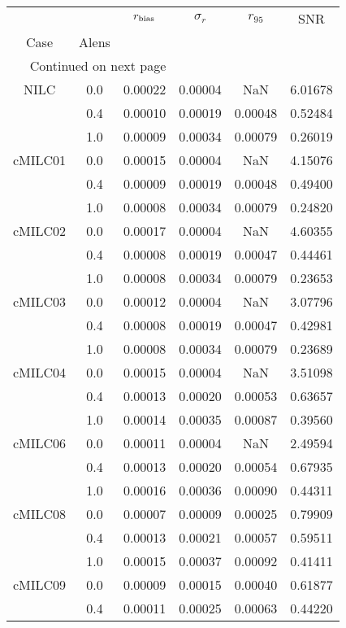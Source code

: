 \begin{longtable}{cccccc}
\toprule
     &     &  $r_{\rm bias}$  &  $\sigma_r$ &  $r_{95}$ &     SNR \\
Case & Alens &                  &             &           &         \\
\midrule
\endhead
\midrule
\multicolumn{3}{r}{{Continued on next page}} \\
\midrule
\endfoot

\bottomrule
\endlastfoot
NILC & 0.0 & 0.00022 & 0.00004 & NaN & 6.01678 \\
     & 0.4 & 0.00010 & 0.00019 & 0.00048 & 0.52484 \\
     & 1.0 & 0.00009 & 0.00034 & 0.00079 & 0.26019 \\
cMILC01 & 0.0 & 0.00015 & 0.00004 & NaN & 4.15076 \\
     & 0.4 & 0.00009 & 0.00019 & 0.00048 & 0.49400 \\
     & 1.0 & 0.00008 & 0.00034 & 0.00079 & 0.24820 \\
cMILC02 & 0.0 & 0.00017 & 0.00004 & NaN & 4.60355 \\
     & 0.4 & 0.00008 & 0.00019 & 0.00047 & 0.44461 \\
     & 1.0 & 0.00008 & 0.00034 & 0.00079 & 0.23653 \\
cMILC03 & 0.0 & 0.00012 & 0.00004 & NaN & 3.07796 \\
     & 0.4 & 0.00008 & 0.00019 & 0.00047 & 0.42981 \\
     & 1.0 & 0.00008 & 0.00034 & 0.00079 & 0.23689 \\
cMILC04 & 0.0 & 0.00015 & 0.00004 & NaN & 3.51098 \\
     & 0.4 & 0.00013 & 0.00020 & 0.00053 & 0.63657 \\
     & 1.0 & 0.00014 & 0.00035 & 0.00087 & 0.39560 \\
cMILC06 & 0.0 & 0.00011 & 0.00004 & NaN & 2.49594 \\
     & 0.4 & 0.00013 & 0.00020 & 0.00054 & 0.67935 \\
     & 1.0 & 0.00016 & 0.00036 & 0.00090 & 0.44311 \\
cMILC08 & 0.0 & 0.00007 & 0.00009 & 0.00025 & 0.79909 \\
     & 0.4 & 0.00013 & 0.00021 & 0.00057 & 0.59511 \\
     & 1.0 & 0.00015 & 0.00037 & 0.00092 & 0.41411 \\
cMILC09 & 0.0 & 0.00009 & 0.00015 & 0.00040 & 0.61877 \\
     & 0.4 & 0.00011 & 0.00025 & 0.00063 & 0.44220 \\

\end{longtable}
